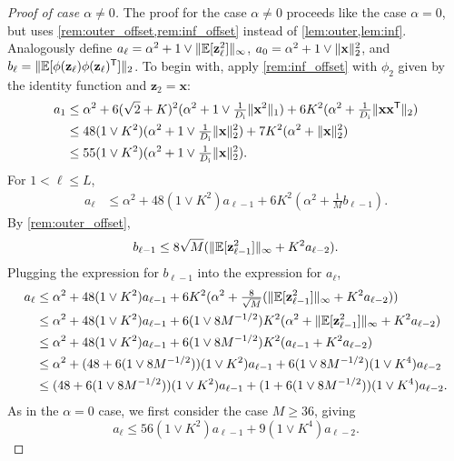 \documentclass[twoside]{article}
\renewcommand{\ss}[1]{_{\text{#1}}}
\newcommand{\vx}{\mathbf{x}}
\newcommand{\vz}{\mathbf{z}}
\newcommand{\E}{\mathbb{E}}
\newcommand{\T}{\text{\textsf{T}}}
\renewcommand{\ss}[1]{_{\text{#1}}}        %
\DeclarePairedDelimiter\norm{\|}{\|}             %
\theoremstyle{theoremstyle}
\begin{document}
\begin{proof}[Proof of case $\alpha \neq 0$]
    The proof for the case $\alpha \neq 0$ proceeds like the case $\alpha = 0$, but uses \cref{rem:outer_offset,rem:inf_offset} instead of \cref{lem:outer,lem:inf}.
    Analogously define $a_\ell = \alpha^2 + 1 \lor \norm{\E[\vz_\ell^2]}_\infty$,
    $a_0 = \alpha^2 + 1 \lor \norm{\vx}^2_2$,
    and $b_\ell = \norm{\E[\phi(\vz_\ell)\phi(\vz_\ell)^\T]}_2$.
    To begin with, apply \cref{rem:inf_offset} with $\phi_2$ given by the identity function and $\vz_2 = \vx$:
    \begin{align}
        a_1
        &\le \alpha^2 + 6(\sqrt{2} + K)^2(\alpha^2 + 1 \lor \tfrac1{D\ss{i}}\norm{\vx^2}_1)+ 6K^2(\alpha^2 + \tfrac1{D\ss{i}} \norm{\vx \vx^\T}_2) \\
        &\le 48(1 \lor K^2)(\alpha^2 + 1 \lor \tfrac1{D\ss{i}}\norm{\vx}_2^2)+ 7K^2(\alpha^2 + \norm{\vx}^2_2) \\
        &\le 55(1 \lor K^2)(\alpha^2 + 1 \lor \tfrac1{D\ss{i}}\norm{\vx}^2_2).
    \end{align}
    For $1 < \ell \le L$,
    \begin{align}
        a_\ell
        &\le
            \alpha^2
            + 48(1 \lor K^2)a_{\ell - 1}
            + 6K^2(\alpha^2 + \tfrac1{M}b_{\ell-1}).%
    \end{align}
    By \cref{rem:outer_offset},
    \begin{align}
        b_{\ell - 1} \le 8 \sqrt{M} (\norm{\E[\vz_{\ell-1}^2]}_\infty + K^2 a_{\ell - 2}).
    \end{align}
    Plugging the expression for $b_{\ell-1}$ into the expression for $a_\ell$,
    \begin{align}
        a_\ell
        &\le
            \alpha^2
            + 48(1 \lor K^2)a_{\ell - 1}
            + 6K^2(\alpha^2 + \tfrac{8}{\sqrt{M}}(\norm{\E[\vz_{\ell-1}^2]}_\infty + K^2 a_{\ell - 2})) \\
        &\le
            \alpha^2
            + 48(1 \lor K^2)a_{\ell - 1}
            + 6(1 \lor 8M^{-1/2})K^2(\alpha^2 + \norm{\E[\vz_{\ell-1}^2]}_\infty + K^2 a_{\ell - 2}) \\
        &\le
            \alpha^2
            + 48(1 \lor K^2)a_{\ell - 1}
            + 6(1 \lor 8M^{-1/2})K^2(a_{\ell - 1} + K^2 a_{\ell - 2}) \\
        &\le
            \alpha^2
            + (48 + 6(1 \lor 8M^{-1/2}))(1 \lor K^2)a_{\ell - 1}
            + 6(1 \lor 8M^{-1/2}) (1 \lor K^4) a_{\ell - 2} \\
        &\le
            (48 + 6(1 \lor 8M^{-1/2}) )(1 \lor K^2)a_{\ell - 1}
            + (1 + 6(1 \lor 8M^{-1/2})) (1 \lor K^4) a_{\ell - 2} .
    \end{align}
    As in the $\alpha=0$ case, we first consider the case $M\ge36$, giving
    \begin{equation}
        a_\ell
        \le
            56(1 \lor K^2)a_{\ell - 1}
            + 9 (1 \lor K^4) a_{\ell - 2} .
    \end{equation}
    

\end{proof}
\end{document}
